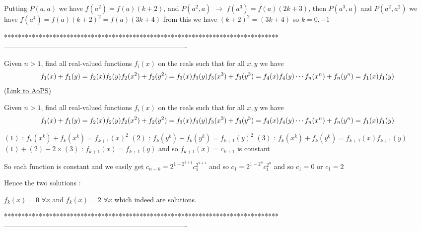 \begin{solution}
	Putting $P(a,a)$ we have $f(a^2)=f(a)(k+2)$, and $P(a^2,a)$  $\to$ $f(a^3)=f(a)(2k+3)$, then  $P(a^3,a)$ and $P(a^2,a^2)$  we have $f(a^4)=f(a)(k+2)^2=f(a)(3k+4)$ from this we have $(k+2)^2=(3k+4)$ so $k={0,-1}$
\end{solution}
*******************************************************************************
-------------------------------------------------------------------------------

\begin{problem}
	Given $n>1$, find all real-valued functions $f_{i}(x)$ on the reals  such that for all $x,y$ we have 
\[f_{1}(x)+f_{1}(y)=f_{2}(x)f_{2}(y) \\f_{2}(x^2)+f_{2}(y^2)=f_{3}(x)f_{3}(y)\\f_{3}(x^3)+f_{3}(y^3)=f_{4}(x)f_{4}(y)\\ \cdots \\ f_{n}(x^n)+f_{n}(y^n)=f_{1}(x)f_{1}(y)\]
	\flushright \href{https://artofproblemsolving.com/community/c6h566088}{(Link to AoPS)}
\end{problem}



\begin{solution}
	\begin{tcolorbox}Given $n>1$, find all real-valued functions $f_{i}(x)$ on the reals  such that for all $x,y$ we have 
\[f_{1}(x)+f_{1}(y)=f_{2}(x)f_{2}(y) \\f_{2}(x^2)+f_{2}(y^2)=f_{3}(x)f_{3}(y)\\f_{3}(x^3)+f_{3}(y^3)=f_{4}(x)f_{4}(y)\\ \cdots \\ f_{n}(x^n)+f_{n}(y^n)=f_{1}(x)f_{1}(y)\]\end{tcolorbox}
$(1)$ : $f_k(x^k)+f_k(x^k)=f_{k+1}(x)^2$
$(2)$ : $f_k(y^k)+f_k(y^k)=f_{k+1}(y)^2$
$(3)$ : $f_k(x^k)+f_k(y^k)=f_{k+1}(x)f_{k+1}(y)$
$(1)+(2)-2\times (3)$ : $f_{k+1}(x)=f_{k+1}(y)$ and so $f_{k+1}(x)=c_{k+1}$ is constant

So each function is constant and we easily get $c_{n-k}=2^{1-2^{k+1}}c_1^{2^{k+1}}$ and so $c_1=2^{1-2^{n}}c_1^{2^{n}}$ and so $c_1=0$ or $c_1=2$

Hence the two solutions :

$\boxed{f_k(x)=0}$ $\forall x$ and $\boxed{f_k(x)=2}$ $\forall x$ which indeed are solutions.
\end{solution}
*******************************************************************************
-------------------------------------------------------------------------------

